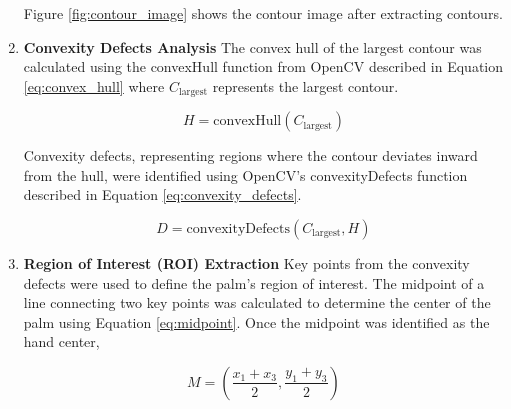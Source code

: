 \begin{enumerate}
    Figure \ref{fig:contour_image} shows the contour image after extracting contours.

    \item \textbf{Convexity Defects Analysis}
    The convex hull of the largest contour was calculated using the convexHull function from OpenCV described in Equation \ref{eq:convex_hull} where \( C_{\text{largest}} \) represents the largest contour.
    
    \begin{equation}
        H = \text{convexHull}(C_{\text{largest}})
        \label{eq:convex_hull}
    \end{equation}

    Convexity defects, representing regions where the contour deviates inward from the hull, were identified using OpenCV's convexityDefects function described in Equation \ref{eq:convexity_defects}.

    \begin{equation}
        D = \text{convexityDefects}(C_{\text{largest}}, H)
        \label{eq:convexity_defects}
    \end{equation}

    \item \textbf{Region of Interest (ROI) Extraction} 
    Key points from the convexity defects were used to define the palm's region of interest. The midpoint of a line connecting two key points was calculated to determine the center of the palm using Equation \ref{eq:midpoint}. Once the midpoint was identified as the hand center,  
    
    \begin{equation}
        M = \left(\frac{x_1 + x_3}{2}, \frac{y_1 + y_3}{2}\right)
        \label{eq:midpoint}
    \end{equation}    


\end{enumerate}
